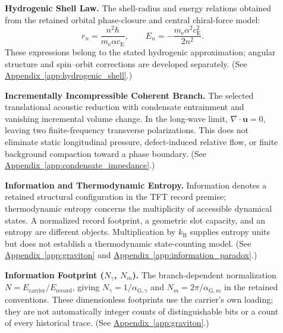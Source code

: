 \begin{description}
\item[] \begin{minipage}[t]{\linewidth}
\textbf{Hydrogenic Shell Law.} The shell-radius and energy relations obtained from the retained orbital phase-closure and central chiral-force model:
\[
 r_n=\frac{n^2\hbar}{m_{\mathrm e}\alpha c_{\mathrm E}},
 \qquad
 E_n=-\frac{m_{\mathrm e}\alpha^2c_{\mathrm E}^2}{2n^2}.
\]
These expressions belong to the stated hydrogenic approximation; angular structure and spin--orbit corrections are developed separately.
(See \hyperref[app:hydrogenic_shell]{Appendix~\ref*{app:hydrogenic_shell}}.)
\end{minipage}

\item[] \begin{minipage}[t]{\linewidth}
\textbf{Incrementally Incompressible Coherent Branch.} The selected translational acoustic reduction with condensate entrainment and vanishing incremental volume change. In the long-wave limit, $\nabla\cdot\mathbf u=0$, leaving two finite-frequency transverse polarizations. This does not eliminate static longitudinal pressure, defect-induced relative flow, or finite background compaction toward a phase boundary.
(See \hyperref[app:condensate_impedance]{Appendix~\ref*{app:condensate_impedance}}.)
\end{minipage}

\item[] \begin{minipage}[t]{\linewidth}
\textbf{Information and Thermodynamic Entropy.} Information denotes a retained structural configuration in the TFT record premise; thermodynamic entropy concerns the multiplicity of accessible dynamical states. A normalized record footprint, a geometric slot capacity, and an entropy are different objects. Multiplication by $k_{\mathrm B}$ supplies entropy units but does not establish a thermodynamic state-counting model.
(See \hyperref[app:graviton]{Appendix~\ref*{app:graviton}} and \hyperref[app:information_paradox]{Appendix~\ref*{app:information_paradox}}.)
\end{minipage}

\item[] \begin{minipage}[t]{\linewidth}
\textbf{Information Footprint ($N_\gamma$, $N_m$).} The branch-dependent normalization $N=E_{\mathrm{carrier}}/E_{\mathrm{record}}$, giving $N_\gamma=1/\alpha_{\mathrm G,\gamma}$ and $N_m=2\pi/\alpha_{\mathrm G,m}$ in the retained conventions. These dimensionless footprints use the carrier's own loading; they are not automatically integer counts of distinguishable bits or a count of every historical trace.
(See \hyperref[app:graviton]{Appendix~\ref*{app:graviton}}.)
\end{minipage}


\end{description}
